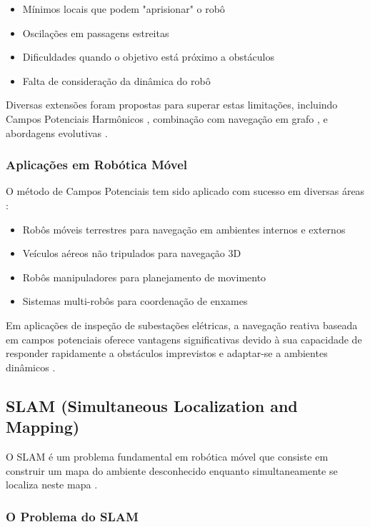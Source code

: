 \begin{itemize}
    \item Mínimos locais que podem "aprisionar" o robô
    \item Oscilações em passagens estreitas
    \item Dificuldades quando o objetivo está próximo a obstáculos
    \item Falta de consideração da dinâmica do robô
\end{itemize}

Diversas extensões foram propostas para superar estas limitações, incluindo Campos Potenciais Harmônicos \cite{Connolly1990}, combinação com navegação em grafo \cite{Barraquand1992}, e abordagens evolutivas \cite{Vadakkepat2000}.

\subsubsection{Aplicações em Robótica Móvel}

O método de Campos Potenciais tem sido aplicado com sucesso em diversas áreas \cite{Siegwart2011, Arkin1998}:

\begin{itemize}
    \item Robôs móveis terrestres para navegação em ambientes internos e externos
    \item Veículos aéreos não tripulados para navegação 3D
    \item Robôs manipuladores para planejamento de movimento
    \item Sistemas multi-robôs para coordenação de enxames
\end{itemize}

Em aplicações de inspeção de subestações elétricas, a navegação reativa baseada em campos potenciais oferece vantagens significativas devido à sua capacidade de responder rapidamente a obstáculos imprevistos e adaptar-se a ambientes dinâmicos \cite{Lactec2022, Iberdrola2022}.

\subsection{SLAM (Simultaneous Localization and Mapping)}

O SLAM é um problema fundamental em robótica móvel que consiste em construir um mapa do ambiente desconhecido enquanto simultaneamente se localiza neste mapa \cite{Durrant2006, Thrun2005}.

\subsubsection{O Problema do SLAM}

